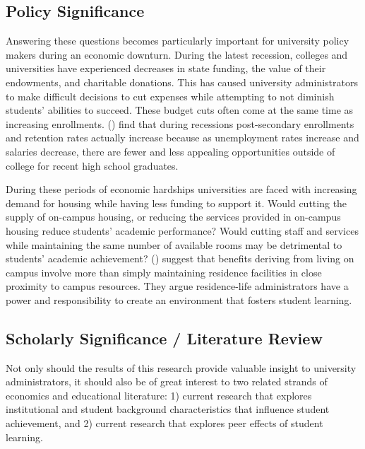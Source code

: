 \documentclass[11pt]{article}
\newcommand{\citee}[1]{\citename{#1} (\citeyear{#1})}
\begin{document}
\subsection{Policy Significance}
Answering these questions becomes particularly important for university policy makers during an economic downturn.  During the latest recession, colleges and universities have experienced decreases in state funding, the value of their endowments, and charitable donations.  This has caused university administrators to make difficult decisions to cut expenses while attempting to not diminish students' abilities to succeed.  These budget cuts often come at the same time as increasing enrollments.  \citee{ds2003} find that during recessions post-secondary enrollments and retention rates actually increase because as unemployment rates increase and salaries decrease, there are fewer and less appealing opportunities outside of college for recent high school graduates.

During these periods of economic hardships universities are faced with increasing demand for housing while having less funding to support it.  Would cutting the supply of on-campus housing, or reducing the services provided in on-campus housing reduce students' academic performance?  Would cutting staff and services while maintaining the same number of available rooms may be detrimental to students' academic achievement?  \citee{sm1994} suggest that benefits deriving from living on campus involve more than simply maintaining residence facilities in close proximity to campus resources.  They argue residence-life administrators have a power and responsibility to create an environment that fosters student learning.  

\subsection{Scholarly Significance / Literature Review}
Not only should the results of this research provide valuable insight to university administrators, it should also be of great interest to two related strands of economics and educational literature: 1) current research that explores institutional and student background characteristics that influence student achievement, and 2) current research that explores peer effects of student learning.
\end{document}
